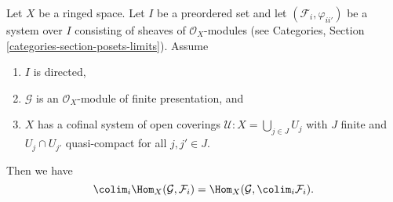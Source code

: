 \begin{lemma}
\label{lemma-finite-presentation-quasi-compact-colimit}
Let $X$ be a ringed space.
Let $I$ be a preordered set and
let $(\mathcal{F}_i, \varphi_{ii'})$ be a system over $I$
consisting of sheaves of $\mathcal{O}_X$-modules
(see Categories, Section \ref{categories-section-posets-limits}).
Assume
\begin{enumerate}
\item $I$ is directed,
\item $\mathcal{G}$ is an $\mathcal{O}_X$-module of finite presentation, and
\item $X$ has a cofinal system of open coverings
$\mathcal{U} : X = \bigcup_{j\in J} U_j$ with
$J$ finite and $U_j \cap U_{j'}$ quasi-compact
for all $j, j' \in J$.
\end{enumerate}
Then we have
$$
\colim_i \Hom_X(\mathcal{G}, \mathcal{F}_i)
=
\Hom_X(\mathcal{G}, \colim_i \mathcal{F}_i).
$$
\end{lemma}

